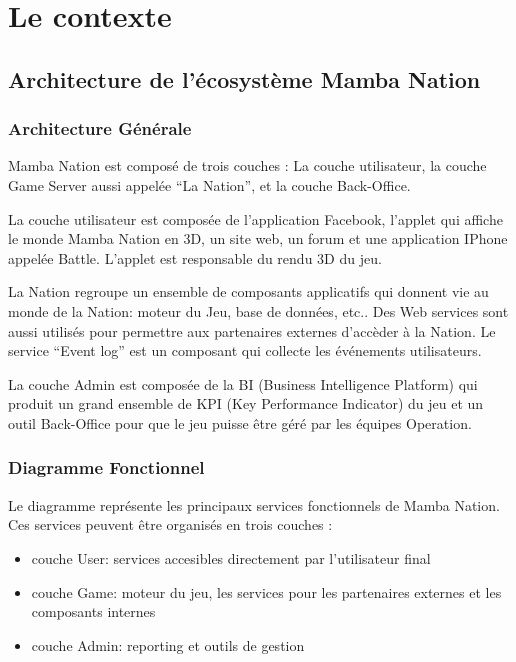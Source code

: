 
\chapter{Le contexte}
\section{Architecture de l'écosystème Mamba Nation}

\subsection{Architecture Générale}

Mamba Nation est composé de trois couches : La couche utilisateur, la couche
Game Server aussi appelée ``La Nation'', et la couche Back-Office.

La couche utilisateur est composée de l'application Facebook, l'applet qui
affiche le monde Mamba Nation en 3D, un site web, un forum et une application
IPhone appelée Battle.
L'applet est responsable du rendu 3D du jeu.

La Nation regroupe un ensemble de composants applicatifs qui donnent vie au
monde de la Nation: moteur du Jeu, base de données, etc.. Des Web services sont
aussi utilisés pour permettre aux partenaires externes d'accèder à la Nation. 
Le service ``Event log'' est un composant qui collecte les événements
utilisateurs.

La couche Admin est composée de la BI (Business Intelligence Platform) qui
produit un grand ensemble de KPI (Key Performance Indicator) du jeu et un outil
Back-Office pour que le jeu puisse être géré par les équipes Operation.

\subsection{Diagramme Fonctionnel}

Le diagramme représente les principaux services fonctionnels de Mamba Nation.
Ces services peuvent être organisés en trois couches :
\begin{itemize}
\item couche User: services accesibles directement par l'utilisateur final
\item couche Game: moteur du jeu, les services pour les partenaires externes et les
  composants internes
\item couche Admin: reporting et outils de gestion
\end{itemize}

